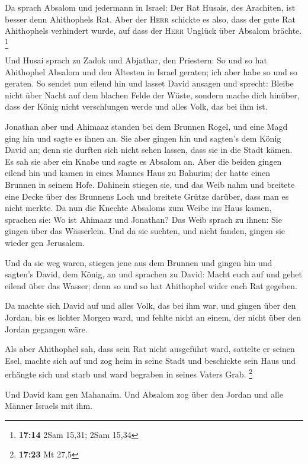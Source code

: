  Da sprach Absalom und jedermann in Israel: Der Rat
Husais, des Arachiten, ist besser denn Ahithophels Rat. Aber der
\textsc{Herr} schickte es also, dass der gute Rat Ahithophels verhindert
wurde, auf dass der \textsc{Herr} Unglück über Absalom brächte.
\footnote{\textbf{17:14} 2Sam 15,31; 2Sam 15,34}

 Und Husai sprach zu Zadok und Abjathar, den Priestern:
So und so hat Ahithophel Absalom und den Ältesten in Israel geraten; ich
aber habe so und so geraten.  So sendet nun eilend hin
und lasset David ansagen und sprecht: Bleibe nicht über Nacht auf dem
blachen Felde der Wüste, sondern mache dich hinüber, dass der König
nicht verschlungen werde und alles Volk, das bei ihm ist.

 Jonathan aber und Ahimaaz standen bei dem Brunnen Rogel,
und eine Magd ging hin und sagte es ihnen an. Sie aber gingen hin und
sagten's dem König David an; denn sie durften sich nicht sehen lassen,
dass sie in die Stadt kämen.  Es sah sie aber ein Knabe
und sagte es Absalom an. Aber die beiden gingen eilend hin und kamen in
eines Mannes Haus zu Bahurim; der hatte einen Brunnen in seinem Hofe.
Dahinein stiegen sie,  und das Weib nahm und breitete
eine Decke über des Brunnens Loch und breitete Grütze darüber, dass man
es nicht merkte.  Da nun die Knechte Absaloms zum Weibe
ins Haus kamen, sprachen sie: Wo ist Ahimaaz und Jonathan? Das Weib
sprach zu ihnen: Sie gingen über das Wässerlein. Und da sie suchten, und
nicht fanden, gingen sie wieder gen Jerusalem.

 Und da sie weg waren, stiegen jene aus dem Brunnen und
gingen hin und sagten's David, dem König, an und sprachen zu David:
Macht euch auf und gehet eilend über das Wasser; denn so und so hat
Ahithophel wider euch Rat gegeben.

 Da machte sich David auf und alles Volk, das bei ihm
war, und gingen über den Jordan, bis es lichter Morgen ward, und fehlte
nicht an einem, der nicht über den Jordan gegangen wäre.

 Als aber Ahithophel sah, dass sein Rat nicht ausgeführt
ward, sattelte er seinen Esel, machte sich auf und zog heim in seine
Stadt und beschickte sein Haus und erhängte sich und starb und ward
begraben in seines Vaters Grab. \footnote{\textbf{17:23} Mt 27,5}

 Und David kam gen Mahanaim. Und Absalom zog über den
Jordan und alle Männer Israels mit ihm.


